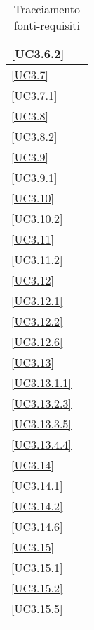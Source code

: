 \begin{longtable}{|P{6cm}|P{6cm}|}
	\hline \ref{UC3.6.2} &  \\
	\hline \ref{UC3.7} &  \\
	\hline \ref{UC3.7.1} &  \\
	\hline \ref{UC3.8} &  \\
	\hline \ref{UC3.8.2} &  \\
	\hline \ref{UC3.9} &  \\
	\hline \ref{UC3.9.1} &  \\
	\hline \ref{UC3.10} &  \\
	\hline \ref{UC3.10.2} &  \\
	\hline \ref{UC3.11} &  \\
	\hline \ref{UC3.11.2} &  \\
	\hline \ref{UC3.12} &  \\
	\hline \ref{UC3.12.1} &  \\
	\hline \ref{UC3.12.2} &  \\
	\hline \ref{UC3.12.6} &  \\
	\hline \ref{UC3.13} &  \\
	\hline \ref{UC3.13.1.1} &  \\
	\hline \ref{UC3.13.2.3} &  \\
	\hline \ref{UC3.13.3.5} &  \\
	\hline \ref{UC3.13.4.4} &  \\
	\hline \ref{UC3.14} &  \\
	\hline \ref{UC3.14.1} &  \\
	\hline \ref{UC3.14.2} &  \\
	\hline \ref{UC3.14.6} &  \\
	\hline \ref{UC3.15} &  \\
	\hline \ref{UC3.15.1} &  \\
	\hline \ref{UC3.15.2} &  \\
	\hline \ref{UC3.15.5} &  \\
	\hline
	\caption{Tracciamento fonti-requisiti}
\end{longtable}


